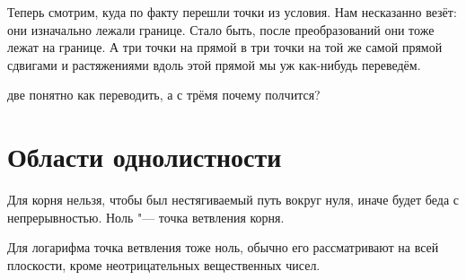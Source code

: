 	Теперь смотрим, куда по факту перешли точки из условия.
	Нам несказанно везёт: они изначально лежали границе.
	Стало быть, после преобразований они тоже лежат на границе.
	А три точки на прямой в три точки на той же самой прямой сдвигами и растяжениями вдоль этой прямой мы уж как-нибудь переведём.

	\TODO две понятно как переводить, а с трёмя почему полчится?

\section{Области однолистности}
	\TODO
	Для корня нельзя, чтобы был нестягиваемый путь вокруг нуля, иначе будет беда с непрерывностью.
	Ноль "--- точка ветвления корня.

	Для логарифма точка ветвления тоже ноль, обычно его рассматривают на всей плоскости, кроме неотрицательных
	вещественных чисел.
